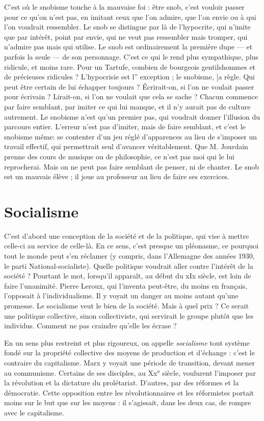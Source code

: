 C’est où le snobisme touche à la mauvaise foi : être snob, c’est vouloir
passer pour ce qu'on n’est pas, en imitant ceux que l’on admire, que l’on envie
ou à qui l’on voudrait ressembler. Le snob se distingue par là de l’hypocrite, qui
n'imite que par intérêt, point par envie, qui ne veut pas ressembler mais
tromper, qui n'admire pas mais qui utilise. Le snob est ordinairement la première dupe —
et parfois la seule — de son personnage. C’est ce qui le rend plus
sympathique, plus ridicule, et moins rare. Pour un Tartufe, combien de bourgeois
gentilshommes et de précieuses ridicules ? L’hypocrisie est l” exception ; le
snobisme, [a règle. Qui peut être certain de lui échapper toujours ? Écrirait-on,
si l’on ne voulait passer pour écrivain ? Lirait-on, si l’on ne voulait que cela se
sache ? Chacun commence par faire semblant, par imiter ce qui lui manque, et
il n’y aurait pas de culture autrement. Le snobisme n’est qu’un premier pas, qui
voudrait donner l'illusion du parcours entier. L'erreur n’est pas d’imiter, mais
de faire semblant, et c’est le snobisme même: se contenter d’un jeu réglé
d’apparences au lieu de s'imposer un travail effectif, qui permettrait seul
d'avancer véritablement. Que M. Jourdain prenne des cours de musique ou de
philosophie, ce n’est pas moi qui le lui reprocherai. Mais on ne peut pas faire
semblant de penser, ni de chanter. Le snob est un mauvais élève ; il joue au professeur
au lieu de faire ses exercices.

\section{Socialisme}
C'est d’abord une conception de la société et de la politique,
qui vise à mettre celle-ci au service de celle-là. En ce sens,
c'est presque un pléonasme, ce pourquoi tout le monde peut s’en réclamer (y
compris, dans l’Allemagne des années 1930, le parti National-socialiste).
Quelle politique voudrait aller contre l'intérêt de la société ? Pourtant le mot,
lorsqu'il apparaît, au début du xIx siècle, est loin de faire l’unanimité. Pierre
Leroux, qui l’inventa peut-être, du moins en français, l’opposait à l’individualisme.
Il y voyait un danger au moins autant qu’une promesse. Le socialisme
veut le bien de la société. Mais à quel prix ? Ce serait une politique collective,
sinon collectiviste, qui servirait le groupe plutôt que les individus. Comment
ne pas craindre qu’elle les écrase ?

En un sens plus restreint et plus rigoureux, on appelle {\it socialisme} tout système
fondé sur la propriété collective des moyens de production et d’échange :
c’est le contraire du capitalisme. Marx y voyait une période de transition,
devant mener au communisme. Certains de ses disciples, au Xx° siècle, voulurent
l’imposer par la révolution et la dictature du prolétariat. D’autres, par des
réformes et la démocratie. Cette opposition entre les révolutionnaires et les
réformistes portait moins sur le but que sur les moyens : il s’agissait, dans les
deux cas, de rompre avec le capitalisme.

